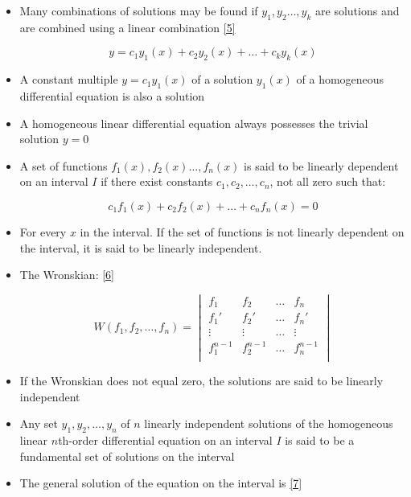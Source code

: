 \documentclass[12pt]{article}
\begin{document}
\begin{itemize}
  \item Many combinations of solutions may be found if $y_1,y_2\dots,y_k$ are solutions and are combined using a linear combination \eqref{5}

    \begin{equation}
      y=c_1y_1(x)+c_2y_2(x)+\dots+c_ky_k(x)
      \label{5}
    \end{equation}

  \item A constant multiple $y=c_1y_1(x)$ of a solution $y_1(x)$ of a homogeneous differential equation is also a solution

  \item A homogeneous linear differential equation always possesses the trivial solution $y=0$

  \item A set of functions $f_1(x), f_2(x)\dots,f_n(x)$ is said to be linearly dependent on an interval $I$ if there exist constants $c_1,c_2,\dots,c_n$, not all zero such that:

    $$c_1f_1(x)+c_2f_2(x)+\dots+c_nf_n(x)=0$$

  \item For every $x$ in the interval. If the set of functions is not linearly dependent on the interval, it is said to be linearly independent.

  \item The Wronskian: \eqref{6}

    \begin{equation}
      W(f_1,f_2,\dots,f_n)=\begin{vmatrix} f_1 & f_2 & \dots & f_n \\ f_1' & f_2' & \dots & f_n' \\ \vdots & \vdots & \dots & \vdots \\ f_1^{n-1} & f_2^{n-1} & \dots & f_n^{n-1} \\   \end{vmatrix}
      \label{6}
    \end{equation}

  \item If the Wronskian does not equal zero, the solutions are said to be linearly independent

  \item Any set $y_1, y_2, \dots, y_n$ of $n$ linearly independent solutions of the homogeneous linear $n$th-order differential equation on an interval $I$ is said to be a fundamental set of solutions on the interval

  \item The general solution of the equation on the interval is \eqref{7}


\end{itemize}
\end{document}
